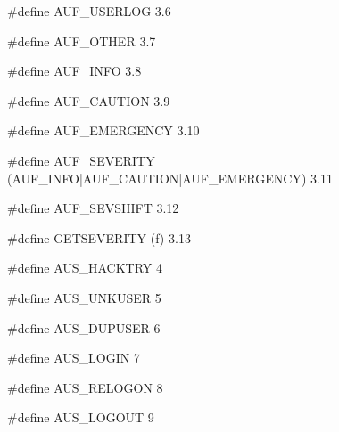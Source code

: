 \documentclass{article}
\begin{document}
\begin{cxxentry}
\begin{cxxmacro}
{\#define}
        {AUF\_USERLOG}
        {}
        {}
        {3.6}
\end{cxxmacro}
\begin{cxxmacro}
{\#define}
        {AUF\_OTHER}
        {}
        {}
        {3.7}
\end{cxxmacro}
\begin{cxxmacro}
{\#define}
        {AUF\_INFO}
        {}
        {}
        {3.8}
\end{cxxmacro}
\begin{cxxmacro}
{\#define}
        {AUF\_CAUTION}
        {}
        {}
        {3.9}
\end{cxxmacro}
\begin{cxxmacro}
{\#define}
        {AUF\_EMERGENCY}
        {}
        {}
        {3.10}
\end{cxxmacro}
\begin{cxxmacro}
{\#define}
        {AUF\_SEVERITY}
        {(AUF\_INFO|AUF\_CAUTION|AUF\_EMERGENCY)}
        {}
        {3.11}
\end{cxxmacro}
\begin{cxxmacro}
{\#define}
        {AUF\_SEVSHIFT}
        {}
        {}
        {3.12}
\end{cxxmacro}
\begin{cxxmacro}
{\#define}
        {GETSEVERITY}
        {(f)}
        {}
        {3.13}
\end{cxxmacro}
\end{cxxentry}
\begin{cxxmacro}
{\#define}
        {AUS\_HACKTRY}
        {}
        {}
        {4}
\end{cxxmacro}
\begin{cxxmacro}
{\#define}
        {AUS\_UNKUSER}
        {}
        {}
        {5}
\end{cxxmacro}
\begin{cxxmacro}
{\#define}
        {AUS\_DUPUSER}
        {}
        {}
        {6}
\end{cxxmacro}
\begin{cxxmacro}
{\#define}
        {AUS\_LOGIN}
        {}
        {}
        {7}
\end{cxxmacro}
\begin{cxxmacro}
{\#define}
        {AUS\_RELOGON}
        {}
        {}
        {8}
\end{cxxmacro}
\begin{cxxmacro}
{\#define}
        {AUS\_LOGOUT}
        {}
        {}
        {9}
\end{cxxmacro}
\end{document}

